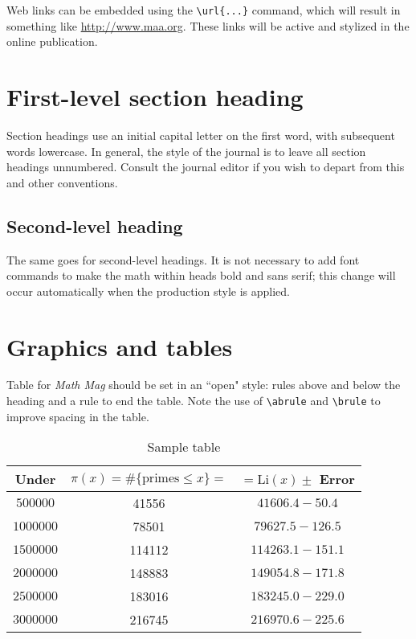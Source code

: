 \documentclass{article}
\theoremstyle{definition}
\begin{document}
Web links can be embedded using the \verb~\url{...}~ command, which will result in something like \url{http://www.maa.org}.  These links will be active and stylized in the online publication.

\section{First-level section heading}

Section headings use an initial capital letter on the first word, with subsequent words lowercase.  In general, the style of the journal is to leave all section headings unnumbered.  Consult the journal editor if you wish to depart from this and other conventions.

\subsection{Second-level heading}

The same goes for second-level headings.  It is not necessary to add font commands to make the math within heads bold and sans serif; this change will occur automatically when the production style is applied.

\section{Graphics and tables}

Table for  \textit{Math Mag} should be set in an ``open" style: rules above and below the heading and a rule to end the table.  Note the use of \verb~\abrule~ and \verb~\brule~ to improve spacing in the table.

\begin{table}[h]
\begin{center}
\begin{tabular}{ccc}
\hline
Under  & $\pi(x) = \#\{\text{primes} \le x\}=$ &   $=\text{Li}(x)\pm$  Error\abrule\\
\hline
$500000$  &  41556 &  $41606.4 - 50.4$ \abrule \\
$1000000$ &  78501 &  $79627.5 - 126.5$\brule \\
$1500000$ & 114112 & $114263.1 - 151.1$\brule \\
$2000000$ & 148883 & $149054.8 - 171.8$\brule \\
$2500000$ & 183016 & $183245.0 - 229.0$\brule \\
$3000000$ & 216745 & $216970.6 - 225.6 $\brule \\
\hline
\end{tabular}
\end{center}
\caption{Sample table}
\end{table}
\end{document}
